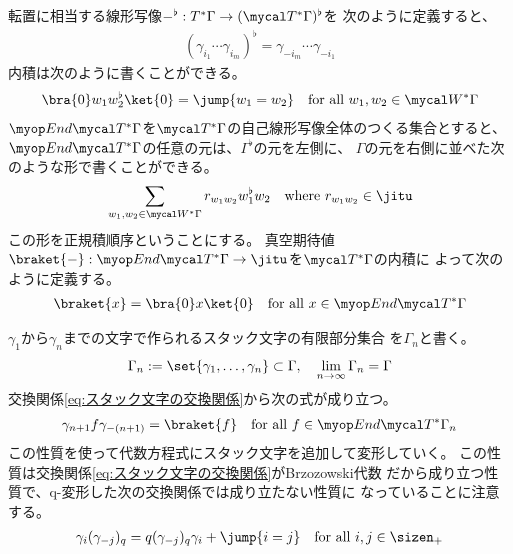 {	転置に相当する線形写像$-^\flat:T^*\Gamma\to(\T^*\Gamma)^\flat$を
	次のように定義すると、
	\begin{equation*}\begin{split}
		(\gamma_{i_1}\cdots\gamma_{i_m})^\flat
		= \gamma_{-i_m}\cdots\gamma_{-i_1}
	\end{split}\end{equation*}
	内積は次のように書くことができる。
	\begin{equation*}\begin{split}
		\bra{0}w_1w_2^\flat\ket{0} = \jump{w_1=w_2}
		\quad\text{for all } w_1,w_2\in\W^*\Gamma
	\end{split}\end{equation*}
	$\End\T^*\Gamma$を$\T^*\Gamma$の自己線形写像全体のつくる集合とすると、
	$\End\T^*\Gamma$の任意の元は、$\Gamma^\flat$の元を左側に、
	$\Gamma$の元を右側に並べた次のような形で書くことができる。
	\begin{equation*}\begin{split}
		\sum_{w_1,w_2\in\W^*\Gamma} r_{w_1w_2} w_1^\flat w_2 
		\quad\text{where } r_{w_1w_2}\in\jitu
	\end{split}\end{equation*}
	この形を正規積順序ということにする。
	真空期待値$\braket{-}:\End\T^*\Gamma\to\jitu$を$\T^*\Gamma$の内積に
	よって次のように定義する。
	\begin{equation*}\begin{split}
		\braket{x} = \bra{0}x\ket{0} \quad\text{for all } x\in\End\T^*\Gamma
	\end{split}\end{equation*}

	$\gamma_1$から$\gamma_n$までの文字で作られるスタック文字の有限部分集合
	を$\Gamma_n$と書く。
	\begin{equation*}\begin{split}
		\Gamma_n := \set{\gamma_1,\dots,\gamma_n} \subset \Gamma
		,\quad \lim_{n\to\infty}\Gamma_n = \Gamma
	\end{split}\end{equation*}
	交換関係\eqref{eq:スタック文字の交換関係}から次の式が成り立つ。
	\begin{equation*}\begin{split}
		\gamma_{n+1}f\gamma_{-(n+1)} = \braket{f}
		\quad\text{for all } f\in\End\T^*\Gamma_n
	\end{split}\end{equation*}
	この性質を使って代数方程式にスタック文字を追加して変形していく。
	この性質は交換関係\eqref{eq:スタック文字の交換関係}がBrzozowski代数
	だから成り立つ性質で、q-変形した次の交換関係では成り立たない性質に
	なっていることに注意する。
	\begin{equation*}\begin{split}
		\gamma_i(\gamma_{-j})_q = q(\gamma_{-j})_q\gamma_i + \jump{i=j}
		\quad\text{for all } i,j\in\sizen_+
	\end{split}\end{equation*}

}
